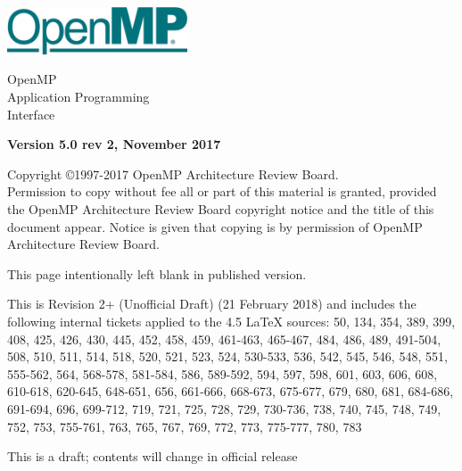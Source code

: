 
  \begin{titlepage}
    \begin{flushleft}
     \hspace{-6em} \includegraphics[width=0.4\textwidth]{openmp-logo.png}
    \end{flushleft}

    \begin{adjustwidth}{-0.75in}{0in}
    \begin{center}
      \Huge
      \textsf{OpenMP\\Application Programming\\Interface}

      \vspace{0.5in}\textsf{    }\vspace{-0.7in}
      \normalsize

      \vspace{1.0in}

      \textbf{Version 5.0 rev 2, November 2017}
    \end{center}
    \end{adjustwidth}

    \vspace{3.0in}

\begin{adjustwidth}{0pt}{1em}\setlength{\parskip}{0.25\baselineskip}%
Copyright \copyright 1997-2017 OpenMP Architecture Review Board.\\
Permission to copy without fee all or part of this material is granted,
provided the OpenMP Architecture Review Board copyright notice and
the title of this document appear. Notice is given that copying is by
permission of OpenMP Architecture Review Board.\end{adjustwidth}

  \end{titlepage}


\clearpage
\thispagestyle{empty}
\phantom{a}
This page intentionally left blank in published version.

This is Revision 2+ (Unofficial Draft) (21 February 2018) and
includes the following internal tickets applied to the 4.5 LaTeX sources:
50, 134, 354, 389, 399, 408, 425, 426, 430, 445, 452, 458, 459, 461-463, 
465-467, 484, 486, 489, 491-504, 508, 510, 511, 514, 518, 520, 521, 523, 
524, 530-533, 536, 542, 545, 546, 548, 551, 555-562, 564, 568-578, 581-584, 
586, 589-592, 594, 597, 598, 601, 603, 606, 608, 610-618, 620-645, 
648-651, 656, 661-666, 668-673, 675-677, 679, 680, 681, 684-686, 691-694, 
696, 699-712, 719, 721, 725, 728, 729, 730-736, 738, 740, 745, 748, 749, 
752, 753, 755-761, 763, 765, 767, 769, 772, 773, 775-777, 780, 783

This is a draft; contents will change in official release

\vfill

